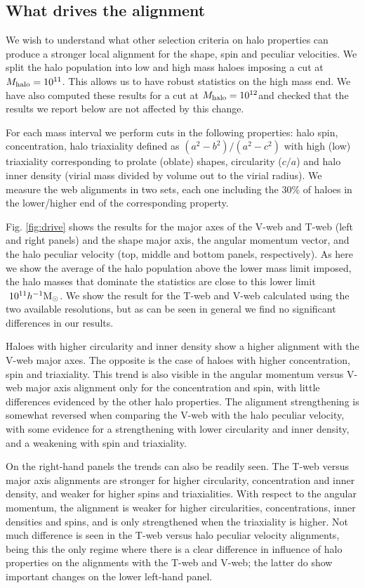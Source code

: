 \documentclass[useAMS,usenatbib]{mn2e}
\newcommand{\hMsun}{{\ifmmode{h^{-1}{\rm
        {M_{\odot}}}}\else{$h^{-1}{\rm{M_{\odot}}}$~}\fi}}
\begin{document}
\subsection{What drives the alignment}

We wish to understand what other selection criteria on halo
properties can produce a stronger local alignment for the shape, spin
and peculiar velocities. We split the halo population into low and
high mass haloes imposing a cut at $M_{\rm halo}=10^{11}$\hMsun. This
allows us to have robust statistics on the high mass end. We have also
computed these results for a cut at $M_{\rm halo}=10^{12}$\hMsun and
checked that the results we report below are not affected by this
change.

For each mass interval we perform cuts in the following properties:
halo spin, concentration, halo triaxiality defined as $(a^2-b^2)/(a^2-c^2)$ with
high (low) triaxiality corresponding to prolate (oblate) shapes,
circularity ($c/a$)  and halo inner density (virial mass divided by
volume out to the virial radius). We measure the web alignments in two
sets, each one including the $30\%$ of haloes in the lower/higher end
of the corresponding property. 

Fig. \ref{fig:drive} shows the results for the major axes of
the V-web and T-web (left and right panels) and the shape major axis,
the angular momentum vector, and the halo peculiar velocity (top, middle
and bottom panels, respectively).  As here we show the average
of the halo population above the lower mass limit imposed, the halo
masses that dominate the statistics are close to this lower limit $~10^{11}\hMsun$.
We show the result for the T-web and V-web calculated using the two
available resolutions, but as can be seen in general we find no
significant differences in our results.

Haloes with higher circularity and inner density show
a higher alignment with the V-web major axes.  The opposite is the case
of haloes with higher concentration, spin and triaxiality.  This trend
is also visible in the angular momentum versus V-web major axis alignment only
for the concentration and spin, with little differences evidenced by the
other halo properties.  The alignment strengthening is somewhat
reversed when comparing the V-web with the halo peculiar velocity,
with some evidence for a strengthening with lower circularity and
inner density, and a weakening with spin and triaxiality.

On the right-hand panels the trends can also be readily seen.  The T-web
versus major axis alignments are stronger for higher circularity,
concentration and inner density, and weaker for higher spins and
triaxialities.  With respect to the angular momentum, the alignment
is weaker for higher circularities, concentrations, inner densities and
spins, and is only strengthened when the triaxiality is higher.
Not much difference is seen in the T-web versus halo peculiar velocity
alignments, being this the only regime where there is a clear difference
in influence of halo properties on the alignments with the T-web and V-web;
the latter do show important changes on the lower left-hand panel.
\end{document}
